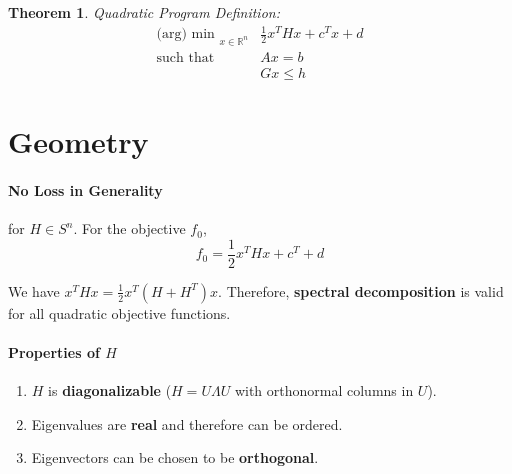 \documentclass[a4paper,12pt]{report}
\newtheorem{theorem}{Theorem}
\begin{document}
\begin{theorem}{Quadratic Program Definition:}
\begin{align}
\text{(arg) min }_{x\in \mathbb{R}^n} & \frac{1}{2} x^T H x + c^T x + d \\
\text{such that } & Ax = b \\
& Gx \leq h
\end{align}
\end{theorem}

\section{Geometry}

\paragraph{No Loss in Generality } for $H\in S^n$. For the objective $f_0$,
\begin{equation}
f_0 = \frac{1}{2} x^T H x + c^T + d
\end{equation}

We have $x^T H x = \frac{1}{2} x^T (H+H^T) x$. Therefore, \textbf{spectral decomposition} is valid for all quadratic objective functions.

\paragraph{Properties of $H$} 
\begin{enumerate}
\item $H$ is \textbf{diagonalizable} ($H = U\Lambda U$ with orthonormal columns in $U$).
\item Eigenvalues are \textbf{real} and therefore can be ordered.
\item Eigenvectors can be chosen to be \textbf{orthogonal}.
\end{enumerate}
\end{document}
